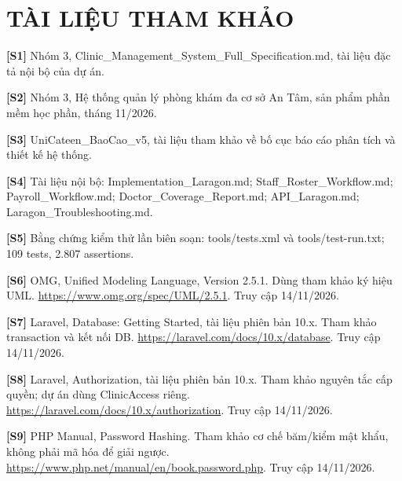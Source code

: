 \chapter*{TÀI LIỆU THAM KHẢO}
\noindent\textbf{[S1]} Nhóm 3, Clinic\_\allowbreak{}Management\_\allowbreak{}System\_\allowbreak{}Full\_\allowbreak{}Specification.\allowbreak{}md, tài liệu đặc tả nội bộ của dự án.\allowbreak{}\par
\noindent\textbf{[S2]} Nhóm 3, Hệ thống quản lý phòng khám đa cơ sở An Tâm, sản phẩm phần mềm học phần, tháng 11/\allowbreak{}2026.\allowbreak{}\par
\noindent\textbf{[S3]} Uni\allowbreak{}Cateen\_\allowbreak{}Bao\allowbreak{}Cao\_\allowbreak{}v5, tài liệu tham khảo về bố cục báo cáo phân tích và thiết kế hệ thống.\allowbreak{}\par
\noindent\textbf{[S4]} Tài liệu nội bộ:\allowbreak{} Implementation\_\allowbreak{}Laragon.\allowbreak{}md; Staff\_\allowbreak{}Roster\_\allowbreak{}Workflow.\allowbreak{}md; Payroll\_\allowbreak{}Workflow.\allowbreak{}md; Doctor\_\allowbreak{}Coverage\_\allowbreak{}Report.\allowbreak{}md; API\_\allowbreak{}Laragon.\allowbreak{}md; Laragon\_\allowbreak{}Troubleshooting.\allowbreak{}md.\allowbreak{}\par
\noindent\textbf{[S5]} Bằng chứng kiểm thử lần biên soạn:\allowbreak{} tools/\allowbreak{}tests.\allowbreak{}xml và tools/\allowbreak{}test-run.\allowbreak{}txt; 109 tests, 2.\allowbreak{}807 assertions.\allowbreak{}\par
\noindent\textbf{[S6]} OMG, Unified Modeling Language, Version 2.\allowbreak{}5.\allowbreak{}1.\allowbreak{} Dùng tham khảo ký hiệu UML.\allowbreak{} \url{https://www.omg.org/spec/UML/2.5.1}. Truy cập 14/11/2026.\par
\noindent\textbf{[S7]} Laravel, Database:\allowbreak{} Getting Started, tài liệu phiên bản 10.\allowbreak{}x.\allowbreak{} Tham khảo transaction và kết nối DB.\allowbreak{} \url{https://laravel.com/docs/10.x/database}. Truy cập 14/11/2026.\par
\noindent\textbf{[S8]} Laravel, Authorization, tài liệu phiên bản 10.\allowbreak{}x.\allowbreak{} Tham khảo nguyên tắc cấp quyền; dự án dùng Clinic\allowbreak{}Access riêng.\allowbreak{} \url{https://laravel.com/docs/10.x/authorization}. Truy cập 14/11/2026.\par
\noindent\textbf{[S9]} PHP Manual, Password Hashing.\allowbreak{} Tham khảo cơ chế băm/\allowbreak{}kiểm mật khẩu, không phải mã hóa để giải ngược.\allowbreak{} \url{https://www.php.net/manual/en/book.password.php}. Truy cập 14/11/2026.\par
